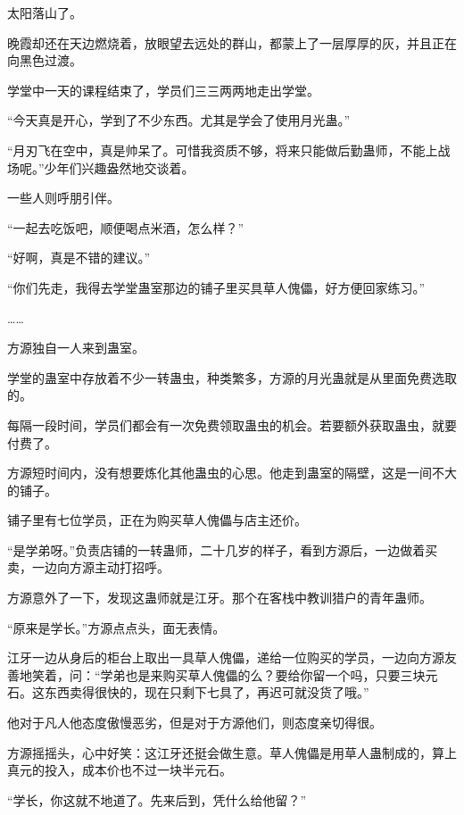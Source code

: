 
\begin{this_body}



太阳落山了。

晚霞却还在天边燃烧着，放眼望去远处的群山，都蒙上了一层厚厚的灰，并且正在向黑色过渡。

学堂中一天的课程结束了，学员们三三两两地走出学堂。

“今天真是开心，学到了不少东西。尤其是学会了使用月光蛊。”

“月刃飞在空中，真是帅呆了。可惜我资质不够，将来只能做后勤蛊师，不能上战场呢。”少年们兴趣盎然地交谈着。

一些人则呼朋引伴。

“一起去吃饭吧，顺便喝点米酒，怎么样？”

“好啊，真是不错的建议。”

“你们先走，我得去学堂蛊室那边的铺子里买具草人傀儡，好方便回家练习。”

……

方源独自一人来到蛊室。

学堂的蛊室中存放着不少一转蛊虫，种类繁多，方源的月光蛊就是从里面免费选取的。

每隔一段时间，学员们都会有一次免费领取蛊虫的机会。若要额外获取蛊虫，就要付费了。

方源短时间内，没有想要炼化其他蛊虫的心思。他走到蛊室的隔壁，这是一间不大的铺子。

铺子里有七位学员，正在为购买草人傀儡与店主还价。

“是学弟呀。”负责店铺的一转蛊师，二十几岁的样子，看到方源后，一边做着买卖，一边向方源主动打招呼。

方源意外了一下，发现这蛊师就是江牙。那个在客栈中教训猎户的青年蛊师。

“原来是学长。”方源点点头，面无表情。

江牙一边从身后的柜台上取出一具草人傀儡，递给一位购买的学员，一边向方源友善地笑着，问：“学弟也是来购买草人傀儡的么？要给你留一个吗，只要三块元石。这东西卖得很快的，现在只剩下七具了，再迟可就没货了哦。”

他对于凡人他态度傲慢恶劣，但是对于方源他们，则态度亲切得很。

方源摇摇头，心中好笑：这江牙还挺会做生意。草人傀儡是用草人蛊制成的，算上真元的投入，成本价也不过一块半元石。

“学长，你这就不地道了。先来后到，凭什么给他留？”


\end{this_body}
